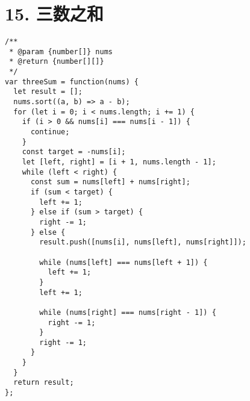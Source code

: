 \newpage
\section{15. 三数之和}
\label{leetcode:15}

\begin{verbatim}
/**
 * @param {number[]} nums
 * @return {number[][]}
 */
var threeSum = function(nums) {
  let result = [];
  nums.sort((a, b) => a - b);
  for (let i = 0; i < nums.length; i += 1) {
    if (i > 0 && nums[i] === nums[i - 1]) {
      continue;
    }
    const target = -nums[i];
    let [left, right] = [i + 1, nums.length - 1];
    while (left < right) {
      const sum = nums[left] + nums[right];
      if (sum < target) {
        left += 1;
      } else if (sum > target) {
        right -= 1;
      } else {
        result.push([nums[i], nums[left], nums[right]]);

        while (nums[left] === nums[left + 1]) {
          left += 1;
        }
        left += 1;

        while (nums[right] === nums[right - 1]) {
          right -= 1;
        }
        right -= 1;
      }
    }
  }
  return result;
};
\end{verbatim}
